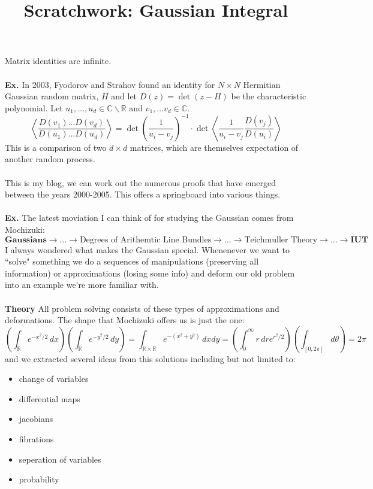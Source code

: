 \documentclass[12pt]{article}
\title{Scratchwork: Gaussian Integral}
\date{}
\begin{document}

\sffamily

\maketitle

\noindent Matrix identities are infinite. \\ \\
\textbf{Ex.} In 2003, Fyodorov and Strahov found an identity for $N \times N$ Hermitian Gaussian random matrix, $H$ and let $D(z) = \det (z - H)$ be the characteristic polynomial.  Let $u_1, \dots, u_d \in \mathbb{C} \backslash \mathbb{R}$ and $v_1, \dots v_d \in \mathbb{C}$. 
$$ 
\left\langle 
\frac{D(v_1) \dots D(v_d)}{D(u_1) \dots D(u_d)}\right\rangle = 
\det \left( \frac{1}{u_i - v_j} \right)^{-1} \cdot
\det \left\langle \frac{1}{u_i - v_j} \frac{D(v_j)}{D(u_i)} \right\rangle
$$
This is a comparison of two $d \times d$ matrices, which are themselves expectation of another random process.  \\ \\
This is my blog, we can work out the numerous proofs that have emerged between the years 2000-2005.  This offers a springboard into various things. \\ \\
\textbf{Ex.} The latest moviation I can think of for studying the Gaussian comes from Mochizuki:
$$
\textbf{Gaussians} \to \dots \to \text{Degrees of Arithemtic Line Bundles} \to \dots \to \text{Teichmuller Theory} \to \dots \to \textbf{IUT} $$
I always wondered what makes the Gaussian special.  Whenenever we want to ``solve" something we do a sequences of manipulations (preserving all information) or approximations (losing some info) and deform our old problem into an example we're more familiar with. \\ \\
{ \color{black!50!white} \textbf{Theory}}
All problem solving consists of these types of approximations and deformations.  The shape that Mochizuki offers us is just the one:
$$
\left(
\int_{\mathbb{R}} e^{-x^2/2} \, dx \right) \left( \int_{\mathbb{R}} e^{-y^2/2} \, dy  \right) 
= \int_{\mathbb{R} \times \mathbb{R}}
e^{-(x^2 + y^2)} \, dx dy 
= \left(\int_0^\infty r \, dr e^{r^2/2} \right) \left( \int_{[0, 2\pi]} d\theta\right) = 2\pi $$
and we extracted several ideas from this solutions including but not limited to:
\begin{itemize}
\item change of variables
\item differential maps
\item jacobians
\item fibrations
\item seperation of variables
\item probability
\end{itemize}
\end{document}
